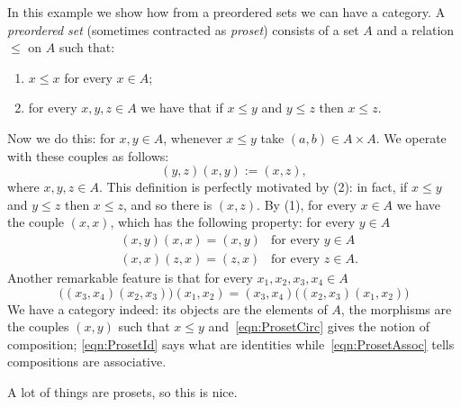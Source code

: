 \begin{example}
In this example we show how from a preordered sets we can have a category. A {\em preordered set} (sometimes contracted as {\em proset}) consists of a set \(A\) and a relation \(\le\) on \(A\) such that:
\begin{enumerate}
\item \(x \le x\) for every \(x \in A\);
\item for every \(x, y, z \in A\) we have that if \(x \le y\) and \(y \le z\) then \(x \le z\).
\end{enumerate}
Now we do this: for \(x, y \in A\), whenever \(x \le y\) take \((a, b) \in A \times A\). We operate with these couples as follows:
\begin{equation}
(y, z) (x, y) := (x, z), \label{eqn:ProsetCirc}
\end{equation}
where \(x, y, z \in A\). This definition is perfectly motivated by (2): in fact, if \(x \le y\) and \(y \le z\) then \(x \le z\), and so there is \((x, z)\). By (1), for every \(x \in A\) we have the couple \((x, x)\), which has the following property: for every \(y \in A\)
\begin{equation}
\begin{aligned}
& (x, y) (x, x) = (x, y) & \text{for every } y \in A \\
& (x, x) (z, x) = (z, x) & \text{for every } z \in A .
\end{aligned}\label{eqn:ProsetId}
\end{equation}
Another remarkable feature is that for every \(x_1, x_2, x_3, x_4 \in A\)
\begin{equation}
\big((x_3, x_4)(x_2, x_3)\big)(x_1, x_2) = (x_3, x_4)\big((x_2, x_3)(x_1, x_2)\big)\label{eqn:ProsetAssoc}
\end{equation}
We have a category indeed: its objects are the elements of \(A\), the morphisms are the couples \((x, y)\) such that \(x \le y\) and~\eqref{eqn:ProsetCirc} gives the notion of composition; \eqref{eqn:ProsetId} says what are identities while~\eqref{eqn:ProsetAssoc} tells compositions are associative.
\end{example}

A lot of things are prosets, so this is nice.

